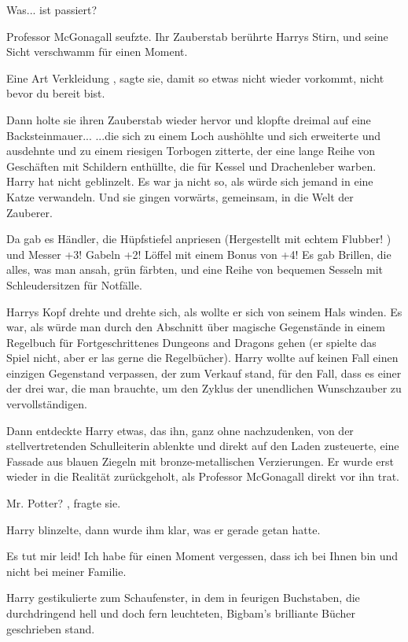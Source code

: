 \glqq Was... ist passiert?\grqq{}

Professor
McGonagall seufzte. Ihr Zauberstab berührte Harrys Stirn, und seine Sicht verschwamm für einen Moment.

\glqq Eine Art Verkleidung\grqq{} , sagte sie, \glqq damit so etwas nicht wieder vorkommt, nicht bevor du
bereit bist.\grqq{}

Dann holte sie ihren Zauberstab wieder hervor und klopfte dreimal auf eine
Backsteinmauer... ...die sich zu einem Loch aushöhlte und sich erweiterte und ausdehnte und zu einem riesigen Torbogen
zitterte, der eine lange Reihe von Geschäften mit Schildern enthüllte, die für Kessel und Drachenleber warben. Harry hat
nicht geblinzelt. Es war ja nicht so, als würde sich jemand in eine Katze verwandeln. Und sie gingen vorwärts,
gemeinsam, in die Welt der Zauberer.

Da gab es Händler, die Hüpfstiefel anpriesen (\glqq Hergestellt mit
echtem Flubber!\grqq{} ) und \glqq Messer +3! Gabeln +2! Löffel mit einem Bonus von +4!\grqq{}
Es gab Brillen, die
alles, was man ansah, grün färbten, und eine Reihe von bequemen Sesseln mit Schleudersitzen für Notfälle.

Harrys Kopf drehte und drehte sich, als wollte er sich von seinem Hals winden. Es war, als würde man durch
den Abschnitt über magische Gegenstände in einem Regelbuch für Fortgeschrittenes Dungeons and Dragons gehen (er spielte
das Spiel nicht, aber er las gerne die Regelbücher). Harry wollte auf keinen Fall einen einzigen Gegenstand verpassen,
der zum Verkauf stand, für den Fall, dass es einer der drei war, die man brauchte, um den Zyklus der unendlichen
Wunschzauber zu vervollständigen.

Dann entdeckte Harry etwas, das ihn, ganz ohne nachzudenken, von der
stellvertretenden Schulleiterin ablenkte und direkt auf den Laden zusteuerte, eine Fassade aus blauen Ziegeln mit
bronze-metallischen Verzierungen. Er wurde erst wieder in die Realität zurückgeholt, als Professor McGonagall direkt vor
ihn trat.

 \glqq Mr. Potter?\grqq{} , fragte sie.

Harry blinzelte, dann wurde ihm klar, was er
gerade getan hatte.

\glqq Es tut mir leid! Ich habe für einen Moment vergessen, dass ich bei Ihnen bin und
nicht bei meiner Familie.\grqq{}

Harry gestikulierte zum Schaufenster, in dem in feurigen Buchstaben, die
durchdringend hell und doch fern leuchteten, \glqq Bigbam's brilliante Bücher\grqq{} geschrieben stand.

